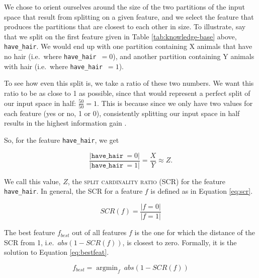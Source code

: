 \documentclass[11pt,a4paper]{article}
\DeclareMathOperator*{\argmin}{argmin}
\newcommand{\havehair}{\texttt{have\_hair}}
\begin{document}
We chose to orient ourselves around the size of the two partitions of the input space that result from splitting on a given feature, and we select the feature that produces the partitions that are closest to each other in size.
To illustrate, say that we split on the first feature given in Table \ref{tab:knowledge-base} above, \havehair.
We would end up with one partition containing X animals that have no hair (i.e.\ where \havehair\ $= 0$), and another partition containing Y animals with hair (i.e.\ where \havehair\ $= 1$).

To see how even this split is, we take a ratio of these two numbers.
We want this ratio to be as close to 1 as possible, since that would represent a perfect split of our input space in half: $\frac{50}{50} = 1$.
This is because since we only have two values for each feature (yes or no, 1 or 0), consistently splitting our input space in half results in the highest information gain \citep[cf.][]{Quinlan1986, Bishop2006}.

So, for the feature \havehair, we get

$$\frac{|\havehair\ = 0|}{|\havehair\ = 1|} = \frac{X}{Y} \approx Z.$$

We call this value, $Z$, the \textsc{split cardinality ratio} (SCR) for the feature \havehair.
In general, the SCR for a feature $f$ is defined as in Equation \ref{eq:scr}.

\begin{equation}
SCR(f) = \frac{|f = 0|}{|f = 1|} 
\label{eq:scr}
\end{equation}

The best feature $f_{best}$ out of all features $f$ is the one for which the distance of the SCR from 1, i.e.\ $abs(1 - SCR(f))$, is closest to zero.
Formally, it is the solution to Equation \ref{eq:bestfeat}.

\begin{equation}
f_{best} = \argmin_f\ abs(1 - SCR(f)) 
\label{eq:bestfeat}
\end{equation}



%
%
\end{document}
